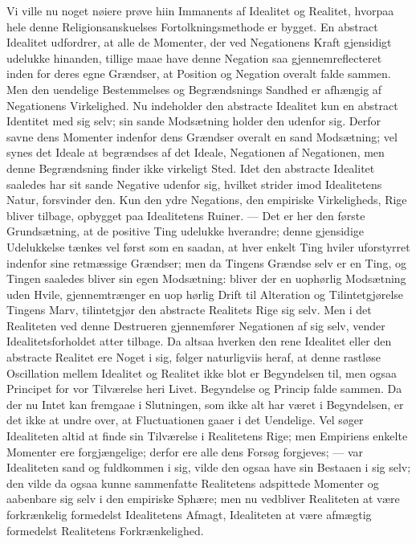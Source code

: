 \documentclass[12pt]{book}
\newcommand{\opage}[1]{\marginnote{\footnotesize\textit{[#1]}}}
\begin{document}
Vi ville nu noget nøiere prøve hiin Immanents af Idealitet og Realitet, hvorpaa
hele denne Religionsanskuelses Fortolkningsmethode er bygget. En abstract
Idealitet udfordrer, at alle de Momenter, der ved Negationens Kraft gjensidigt
udelukke hinanden, tillige maae have denne Negation saa gjennemreflecteret inden
for deres egne Grændser, at Position og Negation overalt falde sammen. Men den
uendelige Bestemmelses og Begrændsnings Sandhed er afhængig af Negationens
Virkelighed. Nu indeholder den abstracte Idealitet kun en abstract Identitet med
sig selv; sin sande Modsætning holder den udenfor sig. Derfor savne dens
Momenter indenfor dens Grændser overalt en sand Modsætning; vel synes det Ideale
at begrændses af det Ideale, Negationen af Negationen, men denne Begrændsning
finder ikke virkeligt Sted. Idet den abstracte Idealitet saaledes har sit sande
Negative udenfor sig, hvilket strider imod Idealitetens Natur, forsvinder den.
Kun den ydre Negations, den empiriske Virkeligheds, Rige bliver tilbage,
opbygget paa Idealitetens Ruiner. --- Det er her den første Grundsætning, at de
positive Ting udelukke hverandre; denne gjensidige Udelukkelse tænkes vel først
som en saadan, at hver enkelt Ting hviler uforstyrret indenfor sine retmæssige
Grændser; men da Tingens Grændse selv er en Ting, og Tingen saaledes bliver sin
egen Modsætning: bliver der en uophørlig Modsætning uden Hvile, gjennemtrænger
en uop\-%
\opage{139}hørlig Drift til Alteration og Tilintetgjørelse Tingens Marv, tilintetgjør den
abstracte Realitets Rige sig selv. Men i det Realiteten ved denne Destrueren
gjennemfører Negationen af sig selv, vender Idealitetsforholdet atter tilbage.
Da altsaa hverken den rene Idealitet eller den abstracte Realitet ere Noget i
sig, følger naturligviis heraf, at denne rastløse Oscillation mellem Idealitet
og Realitet ikke blot er Begyndelsen til, men ogsaa Principet for vor Tilværelse
heri Livet. Begyndelse og Princip falde sammen. Da der nu Intet kan fremgaae i
Slutningen, som ikke alt har været i Begyndelsen, er det ikke at undre over, at
Fluctuationen gaaer i det Uendelige. Vel søger Idealiteten altid at finde sin
Tilværelse i Realitetens Rige; men Empiriens enkelte Momenter ere forgjængelige;
derfor ere alle dens Forsøg forgjeves; --- var Idealiteten sand og fuldkommen i
sig, vilde den ogsaa have sin Bestaaen i sig selv; den vilde da ogsaa kunne
sammenfatte Realitetens adspittede Momenter og aabenbare sig selv i den
empiriske Sphære; men nu vedbliver Realiteten at være forkrænkelig formedelst
Idealitetens Afmagt, Idealiteten at være afmægtig formedelst Realitetens
Forkrænkelighed.
\end{document}
